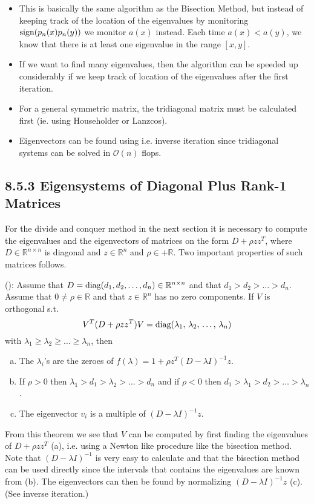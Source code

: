 \begin{itemize}
\item
This is basically the same algorithm as the Bisection Method, 
but instead of keeping track of the location of the eigenvalues by monitoring $\text{sign}{(}p_n(x)p_n(y))$
we monitor $a(x)$ instead. Each time $a(x)<a(y)$, we know that there is at least 
one eigenvalue in the range $[x,y]$.
\item
If we want to find many eigenvalues, then the algorithm can be speeded up considerably if we keep 
track of location of the eigenvalues after the first iteration.
\item
For a general symmetric matrix, the tridiagonal matrix must be calculated first 
(ie. using Householder or Lanzcos).
\item 
Eigenvectors can be found using i.e. inverse iteration since tridiagonal systems can be solved in 
$\mathcal O(n)$ flops.
\end{itemize}


\subsection*{8.5.3 Eigensystems of Diagonal Plus Rank-1 Matrices}%

For the divide and conquer method in the next section it is necessary to compute the eigenvalues
and the eigenvectors of matrices on the form $D+\rho zz^T$, where $D\in\mathbb R^{n\times n}$ is 
diagonal and $z\in\mathbb R^n$ and $\rho\in+\mathbb R$.
Two important properties of such matrices follows.
%
%
%
\begin{theorem} ():
Assume that $D=\text{diag}{(}d_1,d_2,\dots,d_n)\in\mathbb R^{n\times n}$ and that $d_1>d_2>\dots>d_n$.
Assume that $0\neq \rho \in\mathbb R$ and that $z\in\mathbb R^n$ has no zero components.
If $V$ is orthogonal s.t.
\begin{equation*}
	V^T(D+\rho zz^T)V = \text{diag}{(}\lambda_1,\, \lambda_2,\,\dots,\,\lambda_n)
\end{equation*}
with $\lambda_1\ge\lambda_2\ge\dots\ge\lambda_n$, then
\begin{enumerate}[(a):]
	\item The $\lambda_i$'s are the zeroes of $f(\lambda)=1+\rho z^T(D-\lambda I)^{-1}z$.
	\item If $\rho>0$ then $\lambda_1>d_1>\lambda_2>\dots>d_n$ and if
		$\rho<0$ then $d_1>\lambda_1>d_2>\dots>\lambda_n$.
	\item The eigenvector $v_i$ is a multiple of $(D-\lambda I)^{-1}z$.
\end{enumerate}
\end{theorem}
%
From this theorem we see that $V$ can be computed by first finding the eigenvalues of 
$D+\rho zz^T$ (a), i.e. using a Newton like procedure like the bisection method. 
Note that $(D-\lambda I)^{-1}$ is very easy to calculate and that the bisection
method can be used directly since the intervals that contains the eigenvalues are known
from (b).
The eigenvectors can then be found by normalizing $(D-\lambda I)^{-1}z$ (c).
(See inverse iteration.)

